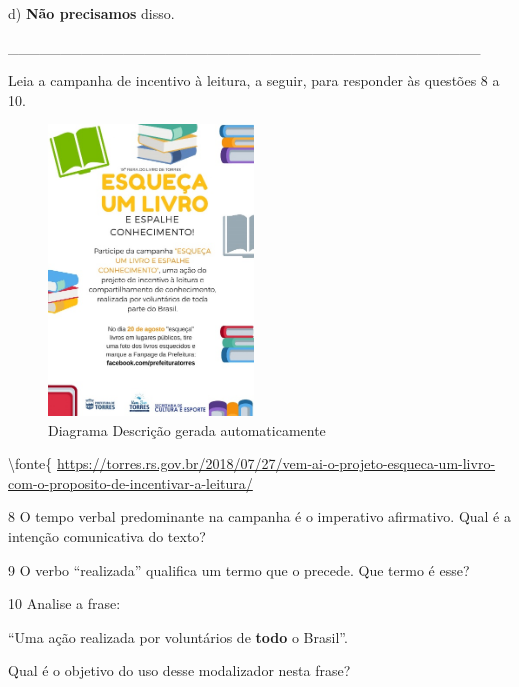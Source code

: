 {d) \textbf{{Não precisamos}} disso.

\_\_\_\_\_\_\_\_\_\_\_\_\_\_\_\_\_\_\_\_\_\_\_\_\_\_\_\_\_\_\_\_\_\_\_\_\_\_\_\_\_\_\_\_\_


Leia a campanha de incentivo à leitura, a seguir, para responder às
questões 8 a 10.

\begin{figure}
\centering
\includegraphics[width=2.14842in,height=3.03846in]{./imgSAEB_6_POR/media/image25.jpeg}
\caption{Diagrama Descrição gerada automaticamente}
\end{figure}

\textbackslash fonte\{
\url{https://torres.rs.gov.br/2018/07/27/vem-ai-o-projeto-esqueca-um-livro-com-o-proposito-de-incentivar-a-leitura/}

\num{8} O tempo verbal predominante na campanha é o imperativo
afirmativo. Qual é a intenção comunicativa do texto?



\num{9} O verbo ``realizada'' qualifica um termo que o precede. Que
termo é esse?



\num{10} Analise a frase:

``Uma ação realizada por voluntários de \textbf{{todo}} o Brasil''.

Qual é o objetivo do uso desse modalizador nesta frase?

}
